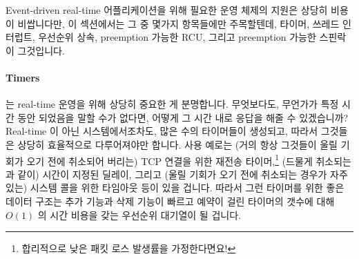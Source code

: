 Event-driven real-time 어플리케이션을 위해 필요한 운영 체제의 지원은 상당히
비용이 비쌉니다만, 이 섹션에서는 그 중 몇가지 항목들에만 주목할텐데, 타이머,
쓰레드 인터럽트, 우선순위 상속, preemption 가능한 RCU, 그리고 preemption 가능한
스핀락이 그것입니다.

\paragraph{Timers} 는 real-time 운영을 위해 상당히 중요한 게 분명합니다.
무엇보다도, 무언가가 특정 시간 동안 되었음을 말할 수가 없다면, 어떻게 그 시간
내로 응답을 해줄 수 있겠습니까?
Real-time 이 아닌 시스템에서조차도, 많은 수의 타이머들이 생성되고, 따라서
그것들은 상당히 효율적으로 다루어져야만 합니다.
사용 예로는 (거의 항상 그것들이 울릴 기회가 오기 전에 취소되어 버리는) TCP
연결을 위한 재전송 타이머,\footnote{
	합리적으로 낮은 패킷 로스 발생률을 가정한다면요!}
(드물게 취소되는  과 같이) 시간이 지정된 딜레이, 그리고 (울릴
기회가 오기 전에 취소되는 경우가 자주 있는)  시스템 콜을 위한
타임아웃 등이 있을 겁니다.
따라서 그런 타이머를 위한 좋은 데이터 구조는 추가 기능과 삭제 기능이 빠르고
예약이 걸린 타이머의 갯수에 대해 $O(1)$ 의 시간 비용을 갖는 우선순위 대기열이
될 겁니다.


